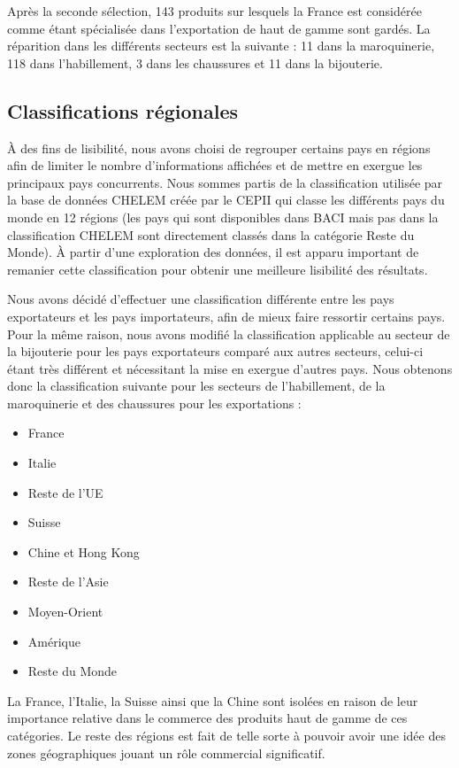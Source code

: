 \documentclass[french,10pt,a4paper]{article}
\begin{document}
Après la seconde sélection, 143 produits sur lesquels la France est considérée comme étant spécialisée dans l'exportation de haut de gamme sont gardés. La réparition dans les différents secteurs est la suivante : 11 dans la maroquinerie, 118 dans l'habillement, 3 dans les chaussures et 11 dans la bijouterie. 

\subsection{Classifications régionales}

À des fins de lisibilité, nous avons choisi de regrouper certains pays en régions afin de limiter le nombre d'informations affichées et de mettre en exergue les principaux pays concurrents. Nous sommes partis de la classification utilisée par la base de données CHELEM créée par le CEPII \citep{SaintVaulry2008} qui classe les différents pays du monde en 12 régions (les pays qui sont disponibles dans BACI mais pas dans la classification CHELEM sont directement classés dans la catégorie \og Reste du Monde\fg{}). À partir d'une exploration des données, il est apparu important de remanier cette classification pour obtenir une meilleure lisibilité des résultats.

Nous avons décidé d'effectuer une classification différente entre les pays exportateurs et les pays importateurs, afin de mieux faire ressortir certains pays. Pour la même raison, nous avons modifié la classification applicable au secteur de la bijouterie pour les pays exportateurs comparé aux autres secteurs, celui-ci étant très différent et nécessitant la mise en exergue d'autres pays. Nous obtenons donc la classification suivante pour les secteurs de l'habillement, de la maroquinerie et des chaussures pour les exportations :

\begin{itemize}
\item France 
\item Italie
\item Reste de l'UE
\item Suisse
\item Chine et Hong Kong
\item Reste de l'Asie
\item Moyen-Orient
\item Amérique
\item Reste du Monde
\end{itemize}

\medskip

La France, l'Italie, la Suisse ainsi que la Chine sont isolées en raison de leur importance relative dans le commerce des produits haut de gamme de ces catégories. Le reste des régions est fait de telle sorte à pouvoir avoir une idée des zones géographiques jouant un rôle commercial significatif.
\end{document}
